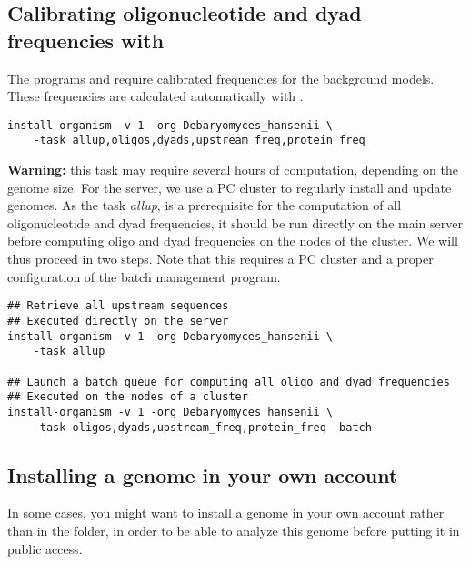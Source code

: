 \subsection{Calibrating oligonucleotide and dyad frequencies with }

The programs  and 
require calibrated frequencies for the background models. These
frequencies are calculated automatically with
.

\begin{footnotesize}
\begin{verbatim}
install-organism -v 1 -org Debaryomyces_hansenii \
    -task allup,oligos,dyads,upstream_freq,protein_freq
\end{verbatim}
\end{footnotesize}

\textbf{Warning: } this task may require several hours of computation,
depending on the genome size. For the \RSAT server, we use a PC
cluster to regularly install and update genomes. As the task
\textit{allup}, is a prerequisite for the computation of all
oligonucleotide and dyad frequencies, it should be run directly on the
main server before computing oligo and dyad frequencies on the nodes
of the cluster. We will thus proceed in two steps. Note that this
requires a PC cluster and a proper configuration of the batch
management program.

\begin{footnotesize}
\begin{verbatim}
## Retrieve all upstream sequences
## Executed directly on the server
install-organism -v 1 -org Debaryomyces_hansenii \
    -task allup

## Launch a batch queue for computing all oligo and dyad frequencies
## Executed on the nodes of a cluster
install-organism -v 1 -org Debaryomyces_hansenii \
    -task oligos,dyads,upstream_freq,protein_freq -batch
\end{verbatim}
\end{footnotesize}

\subsection{Installing a genome in your own account}

In some cases, you might want to install a genome in your own account
rather than in the \RSAT folder, in order to be able to analyze this
genome before putting it in public access.


